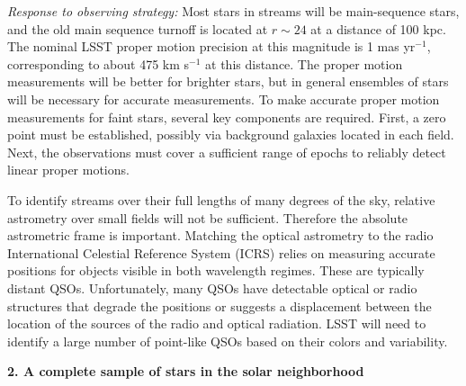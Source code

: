 {\it Response to observing strategy:} Most stars in streams will be main-sequence stars, and the old main sequence turnoff  is located at $r\sim24$ at a distance of 100 kpc.
The nominal LSST proper motion precision at this magnitude is 1 mas yr$^{-1}$, corresponding to about 475 km s$^{-1}$ at this distance. The proper motion
measurements will be better for brighter stars, but in general ensembles of stars will be necessary for accurate measurements. To make accurate proper motion measurements for faint stars, several key components are required. First, a zero point must be established, possibly via background galaxies located in each field. Next, the observations must cover a sufficient range of epochs to reliably detect linear proper motions.

To identify streams over their full lengths of many degrees of the sky, relative astrometry over small fields will not be sufficient. Therefore the absolute astrometric frame is important. Matching the optical astrometry to the radio International Celestial Reference System (ICRS) relies on measuring accurate positions for objects visible in both wavelength regimes.
These are typically distant QSOs. Unfortunately, many QSOs have detectable optical or radio structures that degrade the positions or suggests a displacement between the location of the sources of the radio and optical radiation. LSST will need to identify a large number of point-like QSOs based on their colors and variability.


{\bf 2. A complete sample of stars in the solar neighborhood}

